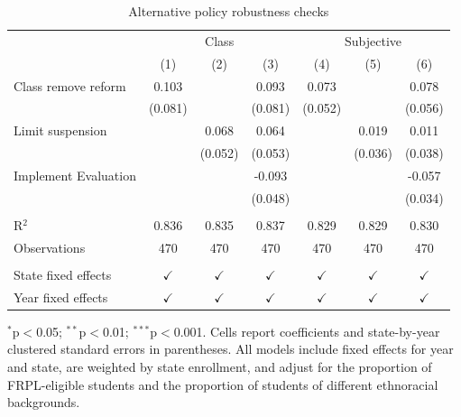 
\begin{table}[!htbp]
   \caption{\label{tab:alt} Alternative policy robustness checks}
   \bigskip
   \centering
   \begin{tabular}{lcccccc}
      \toprule
       & \multicolumn{3}{c}{Class} & \multicolumn{3}{c}{Subjective}\\
                           & (1)           & (2)           & (3)           & (4)           & (5)           & (6)\\  
      \midrule 
      Class remove reform  & 0.103         &               & 0.093         & 0.073         &               & 0.078\\   
                           & (0.081)       &               & (0.081)       & (0.052)       &               & (0.056)\\   
      Limit suspension     &               & 0.068         & 0.064         &               & 0.019         & 0.011\\   
                           &               & (0.052)       & (0.053)       &               & (0.036)       & (0.038)\\   
      Implement Evaluation &               &               & -0.093        &               &               & -0.057\\   
                           &               &               & (0.048)       &               &               & (0.034)\\   
       \\
      R$^2$                & 0.836         & 0.835         & 0.837         & 0.829         & 0.829         & 0.830\\  
      Observations         & 470           & 470           & 470           & 470           & 470           & 470\\  
       \\
      State fixed effects  & $\checkmark$  & $\checkmark$  & $\checkmark$  & $\checkmark$  & $\checkmark$  & $\checkmark$\\   
      Year fixed effects   & $\checkmark$  & $\checkmark$  & $\checkmark$  & $\checkmark$  & $\checkmark$  & $\checkmark$\\   
      \bottomrule
   \end{tabular}
   
   \par \raggedright 
   $^{*}$p$<$0.05; $^{**}$p$<$0.01; $^{***}$p$<$0.001. Cells report coefficients and state-by-year clustered standard errors in parentheses. All models include fixed effects for year and state, are weighted by state enrollment, and adjust for the proportion of FRPL-eligible students and the proportion of students of different ethnoracial backgrounds.
\end{table}


